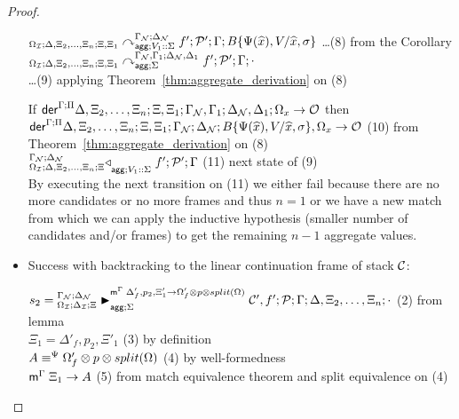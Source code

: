\begin{proof}
\begin{itemize}[leftmargin=*]
      $\derstatea{\Delta, \Xi_2, \dotsc, \Xi_n}{\Xi,
         \Xi_1}{\gammanew}{\deltanew}{V_1 :: \Sigma}{f';
            \lstack{P'}}{B\{\Psi(\widehat{x}), V / \widehat{x}, \sigma\}}$
      \dots \hfill (8) from the Corollary \\

      $\derstatea{\Delta, \Xi_2, \dotsc, \Xi_n}{\Xi, \Xi_1}{\gammanew,
         \Gamma_1}{\deltanew, \Delta_1}{\Sigma}{f'; \lstack{P'}}{\cdot}$
      \\ \dots \hfill (9) applying Theorem~\ref{thm:aggregate_derivation} on (8)

      If $\dz{\Gamma}{\Pi}{\Delta, \Xi_2, \dotsc, \Xi_n}{\Xi, \Xi_1}{\gammanew,
         \Gamma_1}{\deltanew, \Delta_1}{\Omega_x}{\outsem}$ then \\
         \hspace{2cm}
         $\dz{\Gamma}{\Pi}{\Delta, \Xi_2, \dotsc,
            \Xi_n}{\Xi, \Xi_1}{\gammanew}{\deltanew}{B\{\Psi(\widehat{x}), V
               / \widehat{x}, \sigma\}, \Omega_x}{\outsem}$
            \hfill (10) from
      Theorem~\ref{thm:aggregate_derivation} on (8) \\

      $\contstatea{\Delta, \Xi_2, \dotsc, \Xi_n}{f' ; \lstack{P'}}{\Gamma}{V_1
         :: \Sigma}$ \hfill (11) next state of (9) \\

      By executing the next transition on (11) we either fail because there are
      no more candidates or no more frames and thus $n = 1$ or we have a new
      match from which we can apply the inductive hypothesis (smaller number of
      candidates and/or frames) to get the remaining $n - 1$ aggregate
      values.
      
   \item Success with backtracking to the linear continuation frame of stack $\lstack{C}$:
      
      $s_2 = \matstatea{\deltan}{\lstack{C'},
         f';\lstack{P}}{\Gamma}{\Delta, \Xi_2, \dotsc, \Xi_n}{\cdot}{\Delta'_f, p_2, \Xi'_1 \rightarrow \Omega'_f \otimes p
                  \otimes split(\Omega)}{\Sigma}$ \hfill (2) from lemma \\

      $\Xi_1 = \Delta'_f, p_2, \Xi'_1$ \hfill (3) by definition \\

      $\feqa{A}{\Omega'_f \otimes p \otimes split(\Omega)}{\Psi}{\Psi}$ \hfill (4) by
      well-formedness \\
      $\mz{\Gamma}{\Xi_1}{A}$ \hfill (5) from match equivalence
      theorem and split equivalence on (4) \\


\end{itemize}
\end{proof}
